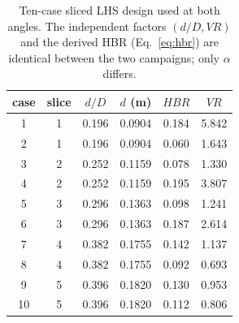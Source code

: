 \documentclass[11pt,a4paper]{article}
\def\dD{d/D}%
\def\VR{VR}%
\def\HBR{HBR}%
\newcommand{\dD}{\ensuremath{d/D}}
\newcommand{\VR}{\ensuremath{\mathrm{VR}}}
\newcommand{\HBR}{\ensuremath{\mathrm{HBR}}}
\begin{document}
\begin{table}[H]
\centering
\small
\caption{Ten-case sliced LHS design used at both angles. The
independent factors \((\dD,\VR)\) and the derived \HBR{}
(Eq.~\ref{eq:hbr}) are identical between the two campaigns;
only \(\alpha\) differs.}
\label{tab:doe_design}
\begin{tabular}{cccccc}
\toprule
case & slice & \(\dD\) & \(d\) (m) & \(\HBR\) & \(\VR\) \\
\midrule
1 & 1 & 0.196 & 0.0904 & 0.184 & 5.842 \\
2 & 1 & 0.196 & 0.0904 & 0.060 & 1.643 \\
3 & 2 & 0.252 & 0.1159 & 0.078 & 1.330 \\
4 & 2 & 0.252 & 0.1159 & 0.195 & 3.807 \\
5 & 3 & 0.296 & 0.1363 & 0.098 & 1.241 \\
6 & 3 & 0.296 & 0.1363 & 0.187 & 2.614 \\
7 & 4 & 0.382 & 0.1755 & 0.142 & 1.137 \\
8 & 4 & 0.382 & 0.1755 & 0.092 & 0.693 \\
9 & 5 & 0.396 & 0.1820 & 0.130 & 0.953 \\
10 & 5 & 0.396 & 0.1820 & 0.112 & 0.806 \\
\bottomrule
\end{tabular}
\end{table}
\end{document}
